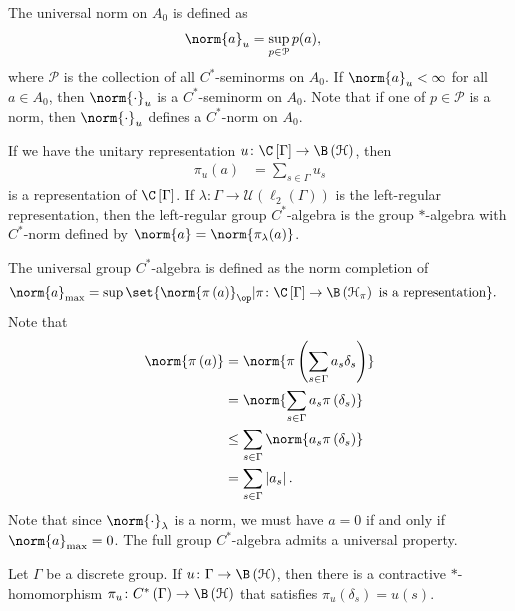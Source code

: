 \documentclass[10pt]{mypackage}
\begin{document}
The universal norm on $A_0$ is defined as
\begin{align*}
  \norm{a}_{u} &= \sup_{p\in \mathcal{P}}p(a),
\end{align*}
where $\mathcal{P}$ is the collection of all $C^{\ast}$-seminorms on $A_0$. If $\norm{a}_u < \infty$ for all $a\in A_0$, then $\norm{\cdot}_u$ is a $C^{\ast}$-seminorm on $A_0$. Note that if one of $p\in \mathcal{P}$ is a norm, then $\norm{\cdot}_{u}$ defines a $C^{\ast}$-norm on $A_0$.\newline

If we have the unitary representation $u\colon \C\left[\Gamma\right]\rightarrow \B\left(\mathcal{H}\right)$, then
\begin{align*}
  \pi_u(a) &= \sum_{s\in\Gamma}u_s
\end{align*}
is a representation of $\C\left[\Gamma\right]$. If $\lambda\colon \Gamma\rightarrow \mathcal{U}\left(\ell_2\left(\Gamma\right)\right)$ is the left-regular representation, then the left-regular group $C^{\ast}$-algebra is the group $\ast$-algebra with $C^{\ast}$-norm defined by $\norm{a} = \norm{\pi_{\lambda}(a)}$.\newline

The universal group $C^{\ast}$-algebra is defined as the norm completion of 
\begin{align*}
  \norm{a}_{\max} &= \sup\set{\norm{\pi\left(a\right)}_{\op} | \pi\colon \C\left[\Gamma\right]\rightarrow \B\left(\mathcal{H}_{\pi}\right) \text{ is a representation}}.
\end{align*}
Note that
\begin{align*}
  \norm{\pi\left(a\right)} &= \norm{\pi\left(\sum_{s\in\Gamma}a_s\delta_s\right)}\\
                           &= \norm{\sum_{s\in\Gamma}a_s\pi\left(\delta_s\right)}\\
                           &\leq \sum_{s\in\Gamma}\norm{a_s\pi\left(\delta_s\right)}\\
                           &= \sum_{s\in\Gamma}\left\vert a_s \right\vert.
\end{align*}
Note that since $\norm{\cdot}_{\lambda}$ is a norm, we must have $a=0$ if and only if $\norm{a}_{\max} = 0$. The full group $C^{\ast}$-algebra admits a universal property.
\begin{proposition}
  Let $\Gamma$ be a discrete group. If $u\colon \Gamma\rightarrow \B\left(\mathcal{H}\right)$, then there is a contractive $\ast$-homomorphism $\pi_u\colon C^{\ast}\left(\Gamma\right)\rightarrow \B\left(\mathcal{H}\right)$ that satisfies $\pi_u\left(\delta_s\right) = u(s)$.
\end{proposition}
\end{document}
